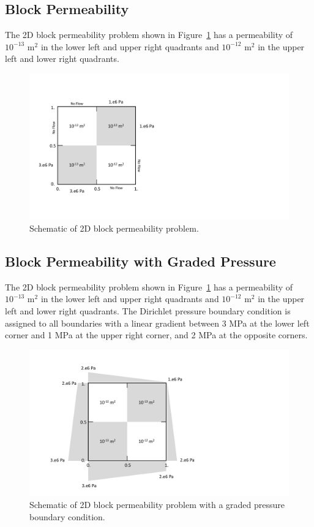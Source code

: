 \documentclass{article}
\begin{document}
\newpage
\subsection{Block Permeability}
The 2D block permeability problem shown in Figure~\ref{fig:2d_block} has a permeability of $10^{-13}$ m$^2$ in the lower left and upper right quadrants and $10^{-12}$ m$^2$ in the upper left and lower right quadrants.
\begin{figure}[htbp]
  \centering
  \includegraphics[width=0.9\linewidth]{figs/2d_block.pdf}
  \caption{Schematic of 2D block permeability problem.}
  \label{fig:2d_block}
\end{figure}

\newpage
\subsection{Block Permeability with Graded Pressure}
The 2D block permeability problem shown in Figure~\ref{fig:2d_block} has a permeability of $10^{-13}$ m$^2$ in the lower left and upper right quadrants and $10^{-12}$ m$^2$ in the upper left and lower right quadrants. The Dirichlet pressure boundary condition is assigned to all boundaries with a linear gradient between 3 MPa at the lower left corner and 1 MPa at the upper right corner, and 2 MPa at the opposite corners.
\begin{figure}[htbp]
  \centering
  \includegraphics[width=0.9\linewidth]{figs/2d_block_graded.pdf}
  \caption{Schematic of 2D block permeability problem with a graded pressure boundary condition.}
  \label{fig:2d_block_graded}
\end{figure}
\end{document}
